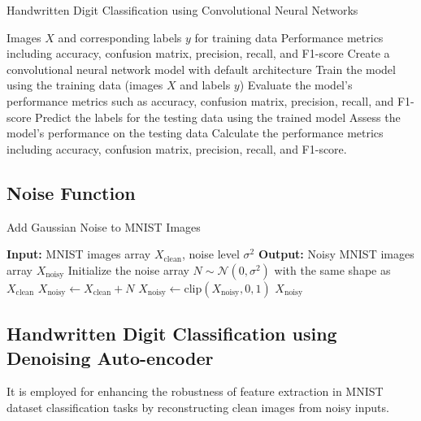 \begin{algorithm}
    \caption{Handwritten Digit Classification using Convolutional Neural Networks}
    \begin{algorithmic}[1]
        \Require Images $X$ and corresponding labels $y$ for training data
        \Ensure Performance metrics including accuracy, confusion matrix, precision, recall, and F1-score
        \State Create a convolutional neural network model with default architecture
        \State Train the model using the training data (images $X$ and labels $y$)
        \State Evaluate the model's performance metrics such as accuracy, confusion matrix, precision, recall, and F1-score
        \State Predict the labels for the testing data using the trained model
        \State Assess the model's performance on the testing data
        \State Calculate the performance metrics including accuracy, confusion matrix, precision, recall, and F1-score.
    \end{algorithmic}
\end{algorithm}

\subsection{Noise Function}

\begin{algorithm}
    \caption{Add Gaussian Noise to MNIST Images}
        \begin{algorithmic}[1]
            \State \textbf{Input:} MNIST images array $X_{\text{clean}}$, noise level $\sigma^2$
            \State \textbf{Output:} Noisy MNIST images array $X_{\text{noisy}}$
            \State Initialize the noise array $N \sim \mathcal{N}(0, \sigma^2)$ with the same shape as $X_{\text{clean}}$
            \State $X_{\text{noisy}} \gets X_{\text{clean}} + N$ 
            \State $X_{\text{noisy}} \gets \text{clip}(X_{\text{noisy}}, 0, 1)$ 
            \State \Return $X_{\text{noisy}}$
        \end{algorithmic}
\end{algorithm}

\subsection{Handwritten Digit Classification using Denoising Auto-encoder}

It is employed for enhancing the robustness of feature extraction in MNIST dataset classification tasks by reconstructing clean images from noisy inputs.


